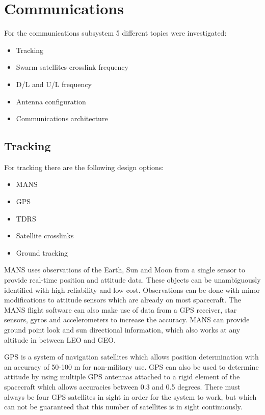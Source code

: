 \section{Communications}
\label{designOptionsCommunications}

For the communications subsystem 5 different topics were investigated:
\begin{itemize}
\item Tracking
\item Swarm satellites crosslink frequency
\item D/L and U/L frequency
\item Antenna configuration
\item Communications architecture
\end{itemize}

\subsection{Tracking}
For tracking there are the following design options:
\begin {itemize}
\item \ac{MANS}
\item \acs{GPS}
\item \ac{TDRS}
\item Satellite crosslinks
\item Ground tracking
\end {itemize}

MANS uses observations of the Earth, Sun and Moon from a single sensor to provide real-time position and attitude data. These objects can be unambiguously identified with high reliability and low cost. Observations can be done with minor modifications to attitude sensors which are already on most spacecraft. The MANS flight software can also make use of data from a GPS receiver, star sensors, gyros and accelerometers to increase the accuracy. MANS can provide ground point look and sun directional information, which also works at any altitude in between \acs{LEO} and \acs{GEO}.

GPS is a system of navigation satellites which allows position determination with an accuracy of 50-100 m for non-military use. GPS can also be used to determine attitude by using multiple GPS antennas attached to a rigid element of the spacecraft which allows accuracies between 0.3 and 0.5 degrees. There must always be four GPS satellites in sight in order for the system to work, but which can not be guaranteed that this number of satellites is in sight continuously.

